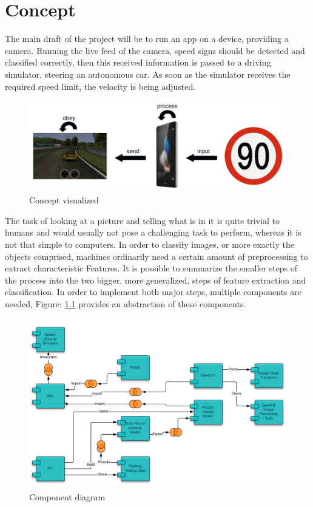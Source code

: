\chapter{Concept}\label{chapter:Concept}
The main draft of the project will be to run an app on a device, providing a camera. Running the live feed of the camera, speed signs should be detected and classified correctly, then this received information is passed to a driving simulator, steering an autonomous car. As soon as the simulator receives the required speed limit, the velocity is being adjusted. 

\begin{figure}[H]
	\includegraphics[width=\linewidth]{images/concept.jpg}
	\caption{Concept visualized}
\end{figure}


The task of looking at a picture and telling what is in it is quite trivial to humans and would usually not pose a challenging task to perform, whereas it is not that simple to computers. In order to classify images, or more exactly the objects comprised, machines ordinarily need a certain amount of preprocessing to extract characteristic Features. It is possible to summarize the smaller steps of the process into the two bigger, more generalized, steps of feature extraction and classification. \newline
In order to implement both major steps, multiple components are needed,  Figure: \ref{fig:components} provides an abstraction of these components.  


\begin{figure}[H]
	\includegraphics[width=\linewidth]{images/components.png}
	\caption{Component diagram}
	\label{fig:components}
\end{figure}

